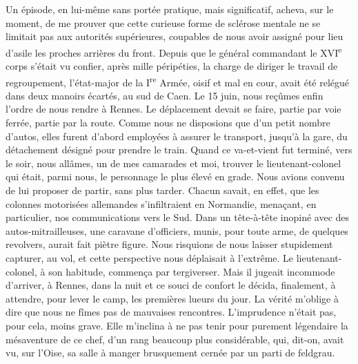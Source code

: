 \documentclass[french,twoside]{book} %
\begin{document}
Un épisode, en lui-même sans portée pratique, mais significatif, acheva, sur le moment, de me prouver que cette curieuse forme de sclérose mentale ne se limitait pas aux autorités supérieures,   coupables de nous avoir assigné pour lieu d’asile les proches arrières du front. Depuis que le général commandant le XVI\textsuperscript{e} corps s’était vu confier, après mille péripéties, la charge de diriger le travail de regroupement, l’état-major de la I\textsuperscript{re} Armée, oisif et mal en cour, avait été relégué dans deux manoirs écartés, au sud de Caen. Le 15 juin, nous reçûmes enfin l’ordre de nous rendre à Rennes. Le déplacement devait se faire, partie par voie ferrée, partie par la route. Comme nous ne disposions que d’un petit nombre d’autos, elles furent d’abord employées à assurer le transport, jusqu’à la gare, du détachement désigné pour prendre le train. Quand ce va-et-vient fut terminé, vers le soir, nous allâmes, un de mes camarades et moi, trouver le lieutenant-colonel qui était, parmi nous, le personnage le plus élevé en grade. Nous avions convenu de lui proposer de partir, sans plus tarder. Chacun savait, en effet, que les colonnes motorisées allemandes s’infiltraient en Normandie, menaçant, en particulier, nos communications vers le Sud. Dans un tête-à-tête inopiné avec des autos-mitrailleuses, une caravane d’officiers, munis, pour toute arme, de quelques revolvers, aurait fait piètre figure. Nous risquions de nous laisser stupidement capturer, au vol, et cette perspective nous déplaisait à l’extrême. Le lieutenant-colonel, à son habitude, commença par tergiverser. Mais il jugeait incommode d’arriver, à Rennes, dans la nuit et ce souci de confort le décida, finalement, à attendre, pour lever le camp, les premières lueurs du jour. La vérité m’oblige à dire que nous ne fîmes pas de mauvaises rencontres. L’imprudence n’était pas, pour cela, moins grave. Elle m’inclina à ne pas tenir pour purement légendaire la mésaventure de ce chef, d’un rang beaucoup plus considérable, qui, dit-on, avait vu, sur l’Oise, sa salle à manger brusquement cernée par un parti de feldgrau.\par
\end{document}
